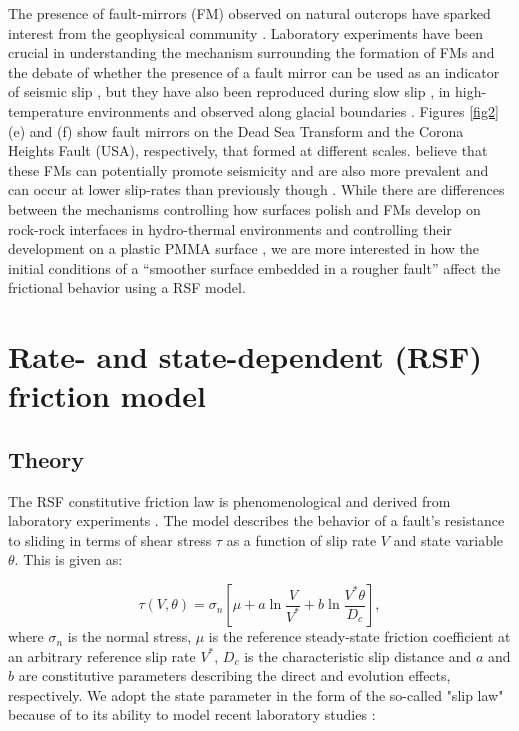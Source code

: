 \documentclass[preprint,1p, 10pt,authoryear]{elsarticle}
\begin{document}
The presence of fault-mirrors (FM) observed on natural outcrops have sparked interest from the geophysical community \citep{Fondriest2013,Kirkpatrick2013, Siman-Tov2013}.  Laboratory experiments have been crucial in understanding the mechanism surrounding the formation of FMs and the debate of whether the presence of a fault mirror can be used as an indicator of seismic slip \citep{Fondriest2013,Siman-Tov2013,Pozzi2018}, but they have also been reproduced during slow slip \citep{Tisato2012,Siman-Tov2015}, in high-temperature environments \citep{Pluymakers2017} and observed along glacial boundaries \citep{Siman-Tov2017}. Figures \ref{fig2}(e) and (f) show fault mirrors on the Dead Sea Transform and the Corona Heights Fault (USA), respectively, that formed at different scales.  \citet{Goldberg2016} believe that these FMs can potentially promote seismicity and are also more prevalent and can occur at lower slip-rates than previously though \citep{Verberne2019}.  While there are differences between the mechanisms controlling how surfaces polish and FMs develop on rock-rock interfaces in hydro-thermal environments and controlling their development on a plastic PMMA surface \citep{Bouissou1998}, we are  more interested in how the initial conditions of a ``smoother surface embedded in a rougher fault'' affect the frictional behavior using a RSF model. 

\section{Rate- and state-dependent (RSF) friction model}
\subsection{Theory}
\label{Theory}
The RSF constitutive friction law is phenomenological and derived from laboratory experiments \citep{Dieterich1979, Ruina1983}.  The model describes the behavior of a fault's resistance to sliding in terms of shear stress $\tau$ as a function of slip rate $V$ and state variable $\theta$. This is given as:

\begin{equation}
\label{eq5}
\tau \left( V,\theta \right) = \sigma_{n} \left[\mu + a \ln\frac{V}{V^{*}} + b \ln\frac{V^{*}\theta}{D_{c}}\right],
\end{equation}   
\noindent where $\sigma_{n}$ is the normal stress, $\mu$ is the reference steady-state friction coefficient at an arbitrary reference slip rate $V^{*}$, $D_{c}$ is the characteristic slip distance and $a$ and $b$ are constitutive parameters describing the direct and evolution effects, respectively.  We adopt the state parameter in the form of the so-called "slip law" because of to its ability to model recent laboratory studies \citep{Bhattacharya2015, Kaneko2011, Kaneko2016}:
\end{document}

